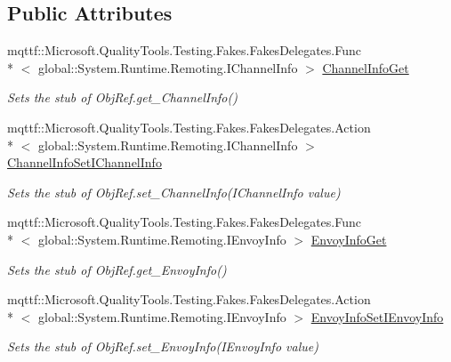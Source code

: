 \subsection*{Public Attributes}
\begin{DoxyCompactItemize}
\item 
mqttf\-::\-Microsoft.\-Quality\-Tools.\-Testing.\-Fakes.\-Fakes\-Delegates.\-Func\\*
$<$ global\-::\-System.\-Runtime.\-Remoting.\-I\-Channel\-Info $>$ \hyperlink{class_system_1_1_runtime_1_1_remoting_1_1_fakes_1_1_stub_obj_ref_aed6ad5f5fc55e593ff4d4d01f72411f5}{Channel\-Info\-Get}
\begin{DoxyCompactList}\small\item\em Sets the stub of Obj\-Ref.\-get\-\_\-\-Channel\-Info()\end{DoxyCompactList}\item 
mqttf\-::\-Microsoft.\-Quality\-Tools.\-Testing.\-Fakes.\-Fakes\-Delegates.\-Action\\*
$<$ global\-::\-System.\-Runtime.\-Remoting.\-I\-Channel\-Info $>$ \hyperlink{class_system_1_1_runtime_1_1_remoting_1_1_fakes_1_1_stub_obj_ref_aabb153379661f77c33480d0de27fcb7c}{Channel\-Info\-Set\-I\-Channel\-Info}
\begin{DoxyCompactList}\small\item\em Sets the stub of Obj\-Ref.\-set\-\_\-\-Channel\-Info(\-I\-Channel\-Info value)\end{DoxyCompactList}\item 
mqttf\-::\-Microsoft.\-Quality\-Tools.\-Testing.\-Fakes.\-Fakes\-Delegates.\-Func\\*
$<$ global\-::\-System.\-Runtime.\-Remoting.\-I\-Envoy\-Info $>$ \hyperlink{class_system_1_1_runtime_1_1_remoting_1_1_fakes_1_1_stub_obj_ref_aadc48a839981561b615681d43be029ba}{Envoy\-Info\-Get}
\begin{DoxyCompactList}\small\item\em Sets the stub of Obj\-Ref.\-get\-\_\-\-Envoy\-Info()\end{DoxyCompactList}\item 
mqttf\-::\-Microsoft.\-Quality\-Tools.\-Testing.\-Fakes.\-Fakes\-Delegates.\-Action\\*
$<$ global\-::\-System.\-Runtime.\-Remoting.\-I\-Envoy\-Info $>$ \hyperlink{class_system_1_1_runtime_1_1_remoting_1_1_fakes_1_1_stub_obj_ref_a70c1dd8b70550e9fc0559e5837b61999}{Envoy\-Info\-Set\-I\-Envoy\-Info}
\begin{DoxyCompactList}\small\item\em Sets the stub of Obj\-Ref.\-set\-\_\-\-Envoy\-Info(\-I\-Envoy\-Info value)\end{DoxyCompactList}\item 

\end{DoxyCompactItemize}
